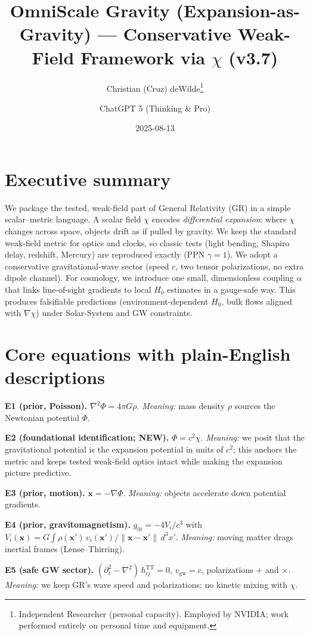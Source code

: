 \documentclass[11pt]{article}
\title{OmniScale Gravity (Expansion-as-Gravity) — Conservative Weak-Field Framework via $\chi$ (v3.7)}
\author{Christian (Cruz) deWilde\thanks{Independent Researcher (personal capacity). Employed by NVIDIA; work performed entirely on personal time and equipment.} \and ChatGPT 5 (Thinking \& Pro)}
\date{2025-08-13}
\begin{document}
\maketitle

\section*{Executive summary}
We package the tested, weak-field part of General Relativity (GR) in a simple scalar–metric language. A scalar field $\chi$ encodes \emph{differential expansion}: where $\chi$ changes across space, objects drift as if pulled by gravity. We keep the standard weak-field metric for optics and clocks, so classic tests (light bending, Shapiro delay, redshift, Mercury) are reproduced exactly (PPN $\gamma=1$). We adopt a conservative gravitational-wave sector (speed $c$, two tensor polarizations, no extra dipole channel). For cosmology, we introduce one small, dimensionless coupling $\alpha$ that links line-of-sight gradients to local $H_0$ estimates in a gauge-safe way. This produces falsifiable predictions (environment-dependent $H_0$, bulk flows aligned with $\nabla\chi$) under Solar-System and GW constraints.

\section*{Core equations with plain-English descriptions}
\textbf{E1 (prior, Poisson).} $\nabla^{2}\Phi = 4\pi G \rho$.
\emph{Meaning:} mass density $\rho$ sources the Newtonian potential $\Phi$.

\textbf{E2 (foundational identification; NEW).} $\boxed{\Phi = c^{2}\chi}$.
\emph{Meaning:} we posit that the gravitational potential is the expansion potential in units of $c^2$; this anchors the metric and keeps tested weak-field optics intact while making the expansion picture predictive.

\textbf{E3 (prior, motion).} $\ddot{\mathbf x} = -\nabla\Phi$.
\emph{Meaning:} objects accelerate down potential gradients.

\textbf{E4 (prior, gravitomagnetism).} $g_{0i} = -4 V_i / c^{3}$ with $V_i(\mathbf x)=G \int \rho(\mathbf x')\, v_i(\mathbf x')/\|\mathbf x-\mathbf x'\|\, d^{3}x'$.
\emph{Meaning:} moving matter drags inertial frames (Lense–Thirring).

\textbf{E5 (safe GW sector).} $(\partial_{t}^{2}-\nabla^{2})\,h_{ij}^{\mathrm{TT}}=0$, $v_{\mathrm{gw}}=c$, polarizations $+$ and $\times$.
\emph{Meaning:} we keep GR’s wave speed and polarizations; no kinetic mixing with $\chi$.
\end{document}
